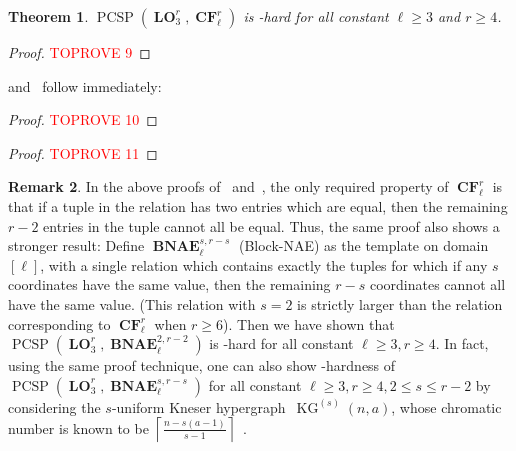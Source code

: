 \documentclass[a4paper,11pt]{article}
\newcommand{\2}{\vec{2}}
\newcommand{\1}{\vec{1}}
\newcommand{\0}{\vec{0}}
\DeclareMathOperator{\KG}{KG}
\DeclareMathOperator{\PCSP}{PCSP}
\DeclareMathOperator{\BNAE}{\mathbf{BNAE}}
\DeclareMathOperator{\CF}{\mathbf{CF}}
\DeclareMathOperator{\LO}{\mathbf{LO}}
\theoremstyle{plain}
\newtheorem{theorem}{Theorem}
\theoremstyle{definition}
\newtheorem{remark}[theorem]{Remark}
\begin{document}
\begin{theorem}\label{locf}
$\PCSP(\LO_3^r, \CF_\ell^r)$ is \NP-hard for all constant $\ell \geq 3$ and $r\geq 4$.
\end{theorem}
\begin{proof}\textcolor{red}{TOPROVE 9}\end{proof}
 and~ follow immediately:
\cf*
\begin{proof}\textcolor{red}{TOPROVE 10}\end{proof}
    
\lo*

\begin{proof}\textcolor{red}{TOPROVE 11}\end{proof}
\begin{remark}
    In the above proofs of~ and~, the only required property of $\CF_\ell^r$ is that if a tuple in the relation has two entries which are equal, then the remaining $r-2$ entries in the tuple cannot all be equal. Thus, the same proof also shows a stronger result: 
Define $\BNAE_\ell^{s,r-s}$ 
    (Block-NAE) as the template on domain $[\ell]$, with a single relation which contains exactly the tuples for which if any $s$ coordinates have the same value, then the remaining $r-s$ coordinates cannot all have the same value. (This relation with $s=2$ is strictly larger than the relation corresponding to $\CF_\ell^r$ when $r \geq 6$). Then we have shown that $\PCSP(\LO_3^r, \BNAE_\ell^{2,r-2})$ is \NP-hard for all constant $\ell \geq 3, r\geq 4$. 
In fact, using the same proof technique, one can also show \NP-hardness of $\PCSP(\LO_3^r, \BNAE_\ell^{s,r-s})$ for all constant $\ell \geq 3, r\geq 4, 2\leq s \leq r-2$ by considering the $s$-uniform Kneser hypergraph~$\KG^{(s)}(n,a)$, whose chromatic number is known to be  $\left\lceil\frac{n-s(a-1)}{s-1}\right\rceil$~\cite{AFL86}.
\end{remark}

{\small


}
\end{document}
